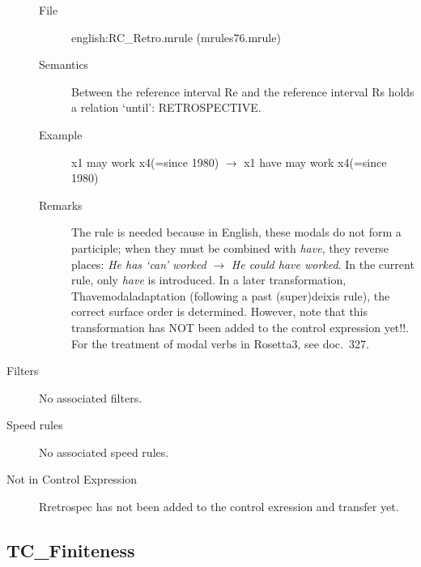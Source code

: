 \begin{description}
\begin{description}
\item[File] english:RC\_Retro.mrule (mrules76.mrule)
\item[Semantics]Between the reference interval Re and the reference interval 
Rs holds a relation `until': RETROSPECTIVE.

\item[Example] x1 may work x4(=since 1980) $\rightarrow$ x1 have may work
 x4(=since 1980)

\item[Remarks] The rule is needed because in English, 
these modals do not form a participle;
when they must be combined with {\em have\/}, they reverse places: {\em He has 
`can' worked\/} $\rightarrow$ {\em He could have worked\/}. 
In the current rule, only 
{\em have\/} is introduced. In a later transformation, Thavemodaladaptation 
(following a past (super)deixis rule), the  
correct surface order is determined. However, note that this transformation
has NOT been added to the control expression yet!!.\\
For the treatment of modal verbs in Rosetta3, see doc.\ 327.
\end{description}
\item [Filters] No associated filters.
\item [Speed rules] No associated speed rules.
\item [Not in Control Expression] Rretrospec has not been added to the control 
exression and transfer yet.
\end{description}

\newpage
\subsection{TC\_Finiteness}

